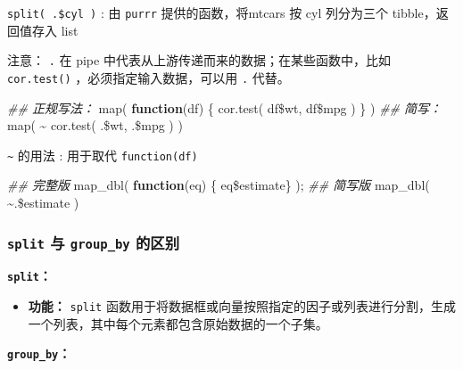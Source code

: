 \documentclass[
]{article}
\newenvironment{Shaded}{}{}
\newcommand{\ControlFlowTok}[1]{\textcolor[rgb]{0.00,0.44,0.13}{\textbf{#1}}}
\newcommand{\DocumentationTok}[1]{\textcolor[rgb]{0.73,0.13,0.13}{\textit{#1}}}
\newcommand{\FunctionTok}[1]{\textcolor[rgb]{0.02,0.16,0.49}{#1}}
\newcommand{\NormalTok}[1]{#1}
\newcommand{\SpecialCharTok}[1]{\textcolor[rgb]{0.25,0.44,0.63}{#1}}
\begin{document}
\texttt{split(\ .\$cyl\ )} : 由 \texttt{purrr} 提供的函数，将mtcars 按
cyl 列分为三个 tibble，返回值存入 list

注意： \texttt{.} 在 pipe 中代表从上游传递而来的数据；在某些函数中，比如
\texttt{cor.test()} ，必须指定输入数据，可以用 \texttt{.} 代替。

\begin{Shaded}
\begin{Highlighting}[]
\DocumentationTok{\#\# 正规写法：}
\FunctionTok{map}\NormalTok{( }\ControlFlowTok{function}\NormalTok{(df) \{ }\FunctionTok{cor.test}\NormalTok{( df}\SpecialCharTok{\$}\NormalTok{wt, df}\SpecialCharTok{\$}\NormalTok{mpg ) \} )}
\DocumentationTok{\#\# 简写：}
\FunctionTok{map}\NormalTok{( }\SpecialCharTok{\textasciitilde{}} \FunctionTok{cor.test}\NormalTok{( .}\SpecialCharTok{\$}\NormalTok{wt, .}\SpecialCharTok{\$}\NormalTok{mpg ) )}
\end{Highlighting}
\end{Shaded}

\texttt{\textasciitilde{}} 的用法 : 用于取代 \texttt{function(df)}

\begin{Shaded}
\begin{Highlighting}[]
\DocumentationTok{\#\# 完整版}
\FunctionTok{map\_dbl}\NormalTok{( }\ControlFlowTok{function}\NormalTok{(eq) \{ eq}\SpecialCharTok{\$}\NormalTok{estimate\} );}
\DocumentationTok{\#\# 简写版}
\FunctionTok{map\_dbl}\NormalTok{( }\SpecialCharTok{\textasciitilde{}}\NormalTok{.}\SpecialCharTok{\$}\NormalTok{estimate )}
\end{Highlighting}
\end{Shaded}

\hypertarget{split-ux4e0e--groupby-ux7684ux533aux522b}{%
\subsubsection{\texorpdfstring{\texttt{split} 与 \texttt{group\_by}
的区别}{split 与 group\_by 的区别}}\label{split-ux4e0e--groupby-ux7684ux533aux522b}}

\textbf{\texttt{split}：}

\begin{itemize}
\item
  \textbf{功能：} \texttt{split}
  函数用于将数据框或向量按照指定的因子或列表进行分割，生成一个列表，其中每个元素都包含原始数据的一个子集。
\end{itemize}

\textbf{\texttt{group\_by}：}
\end{document}
